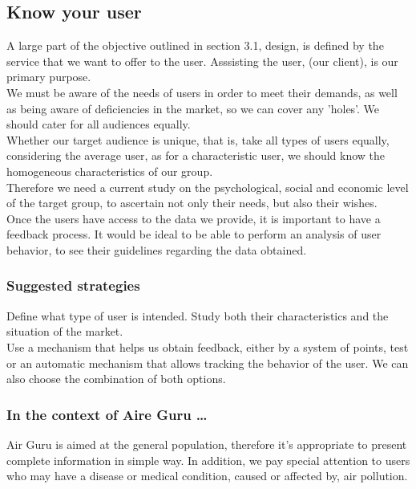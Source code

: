 \subsection{Know your user}

A large part of the objective outlined in section 3.1, design, is defined by the service that we want to offer
to the user. Asssisting the user, (our client), is our primary purpose. \\

We must be aware of the needs of users in order to meet their demands, as well as being aware of deficiencies in the market, so we can cover any 'holes'.
We should cater for all audiences equally.\\

Whether our target audience is unique, that is, take all types of users equally, considering the
average user, as for a characteristic user, we should know the homogeneous characteristics of our group.\\

Therefore we need a current study on the psychological, social and economic level of the target group, to ascertain not only
their needs, but also their wishes.\\

Once the users have access to the data we provide, it is important to have a feedback process.
It would be ideal to be able to perform an analysis of user behavior, to see their guidelines regarding the data obtained.

\subsubsection*{Suggested strategies} 

Define what type of user is intended. Study both their characteristics and the situation of the
market.\\
Use a mechanism that helps us obtain feedback, either by a system of points, test or
an automatic mechanism that allows tracking the behavior of the user. We can also choose the combination of both
options.

\subsubsection*{In the context of Aire Guru \ldots}

Air Guru is aimed at the general population, therefore it's appropriate to present complete information in simple way. In addition, we pay special attention to users who may have a
disease or medical condition, caused or affected by, air pollution.\\

